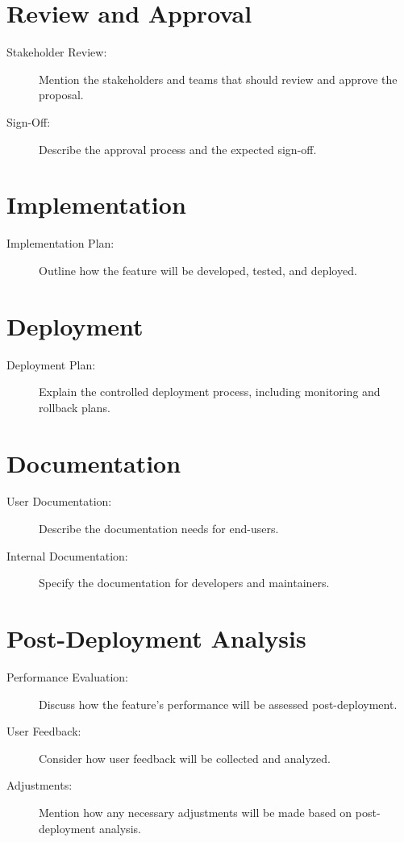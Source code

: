 \documentclass{article}
\begin{document}
\section{Review and Approval}
\begin{description}
    \item[Stakeholder Review:] Mention the stakeholders and teams that should review and approve the proposal.
    \item[Sign-Off:] Describe the approval process and the expected sign-off.
\end{description}

\section{Implementation}
\begin{description}
    \item[Implementation Plan:] Outline how the feature will be developed, tested, and deployed.
\end{description}

\section{Deployment}
\begin{description}
    \item[Deployment Plan:] Explain the controlled deployment process, including monitoring and rollback plans.
\end{description}

\section{Documentation}
\begin{description}
    \item[User Documentation:] Describe the documentation needs for end-users.
    \item[Internal Documentation:] Specify the documentation for developers and maintainers.
\end{description}

\section{Post-Deployment Analysis}
\begin{description}
    \item[Performance Evaluation:] Discuss how the feature's performance will be assessed post-deployment.
    \item[User Feedback:] Consider how user feedback will be collected and analyzed.
    \item[Adjustments:] Mention how any necessary adjustments will be made based on post-deployment analysis.
\end{description}
\end{document}

